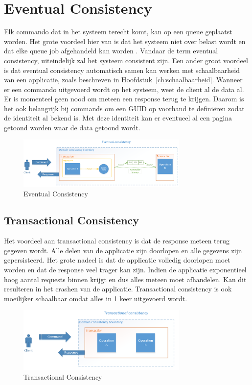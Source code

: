 
\section{Eventual Consistency}
\label{sec:eventual-consistency}

Elk commando dat in het systeem terecht komt, kan op een queue geplaatst worden. Het grote voordeel hier van is dat het systeem niet over belast wordt en dat elke queue job afgehandeld kan worden \autocite{King2015EventualConsistency}. Vandaar de term eventual consistency, uiteindelijk zal het systeem consistent zijn. Een ander groot voordeel is dat eventual consistency automatisch samen kan werken met schaalbaarheid van een applicatie, zoals beschreven in Hoofdstuk~\ref{ch:schaalbaarheid}. Wanneer er een commando uitgevoerd wordt op het systeem, weet de client al de data al. Er is momenteel geen nood om meteen een response terug te krijgen.
Daarom is het ook belangrijk bij commands om een GUID op voorhand te definiëren zodat de identiteit al bekend is. Met deze identiteit kan er eventueel al een pagina getoond worden waar de data getoond wordt.

\begin{figure}[h]
\caption{Eventual Consistency}
\centering
\includegraphics[width=0.75\textwidth]{img/eventual-consistency}
\end{figure}

\subsection{Transactional Consistency}
\label{subsec:transactional-consistency}

Het voordeel aan transactional consistency is dat de response meteen terug gegeven wordt. Alle delen van de applicatie zijn doorlopen en alle gegevens zijn gepersisteerd. Het grote nadeel is dat de applicatie volledig doorlopen moet worden en dat de response veel trager kan zijn. Indien de applicatie exponentieel hoog aantal requests binnen krijgt en dus alles meteen moet afhandelen. Kan dit resulteren in het crashen van de applicatie.
Transactional consistency is ook moeilijker schaalbaar omdat alles in 1 keer uitgevoerd wordt.

\begin{figure}[h]
\caption{Transactional Consistency}
\centering
\includegraphics[width=0.75\textwidth]{img/transactional-consistency}
\end{figure}
